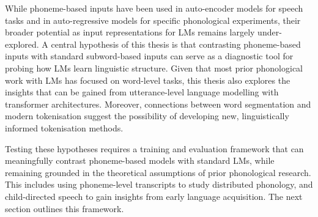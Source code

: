 While phoneme-based inputs have been used in auto-encoder models for speech tasks and in auto-regressive models for specific phonological experiments, their broader potential as input representations for LMs remains largely under-explored. A central hypothesis of this thesis is that contrasting phoneme-based inputs with standard subword-based inputs can serve as a diagnostic tool for probing how LMs learn linguistic structure. Given that most prior phonological work with LMs has focused on word-level tasks, this thesis also explores the insights that can be gained from utterance-level language modelling with transformer architectures. Moreover, connections between word segmentation and modern tokenisation suggest the possibility of developing new, linguistically informed tokenisation methods.

Testing these hypotheses requires a training and evaluation framework that can meaningfully contrast phoneme-based models with standard LMs, while remaining grounded in the theoretical assumptions of prior phonological research. This includes using phoneme-level transcripts to study distributed phonology, and child-directed speech to gain insights from early language acquisition. The next section outlines this framework.





